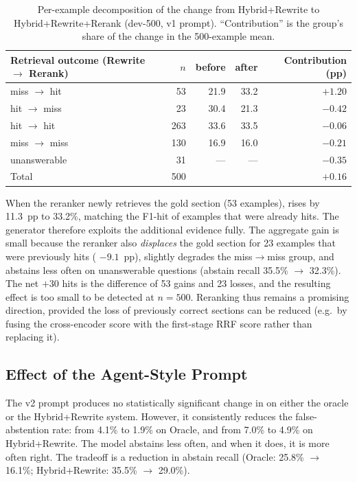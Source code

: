 \begin{table}[ht]
    \centering
    \caption{Per-example decomposition of the \fone{} change from Hybrid+Rewrite
             to Hybrid+Rewrite+Rerank (dev-500, v1 prompt). ``Contribution'' is
             the group's share of the change in the 500-example mean.}
    \label{tab:rag:rerank}
    \small
    \begin{tabular}{lrrrr}
        \toprule
        Retrieval outcome (Rewrite $\to$ Rerank) & $n$ & \fone{} before & \fone{} after & Contribution (pp) \\
        \midrule
        miss $\to$ hit   &  53 & 21.9 & 33.2 & $+1.20$ \\
        hit $\to$ miss   &  23 & 30.4 & 21.3 & $-0.42$ \\
        hit $\to$ hit    & 263 & 33.6 & 33.5 & $-0.06$ \\
        miss $\to$ miss  & 130 & 16.9 & 16.0 & $-0.21$ \\
        unanswerable     &  31 &  --- &  --- & $-0.35$ \\
        \midrule
        Total            & 500 &      &      & $+0.16$ \\
        \bottomrule
    \end{tabular}
\end{table}

When the reranker newly retrieves the gold section (53 examples), \fone{} rises by
11.3~pp to 33.2\%, matching the F1-hit of examples that were already hits. The
generator therefore exploits the additional evidence fully. The aggregate gain is
small because the reranker also \emph{displaces} the gold section for 23 examples
that were previously hits (\fone{} $-9.1$~pp), slightly degrades the
miss$\to$miss group, and abstains less often on unanswerable questions (abstain
recall 35.5\% $\to$ 32.3\%). The net $+30$ hits is the difference of 53 gains and
23 losses, and the resulting effect is too small to be detected at $n = 500$.
Reranking thus remains a promising direction, provided the loss of previously
correct sections can be reduced (e.g.\ by fusing the cross-encoder score with the
first-stage RRF score rather than replacing it).

\subsection{Effect of the Agent-Style Prompt}

The v2 prompt produces no statistically significant change in \fone{} on either the
oracle or the Hybrid+Rewrite system. However, it consistently reduces the
false-abstention rate: from 4.1\% to 1.9\% on Oracle, and from 7.0\% to 4.9\% on
Hybrid+Rewrite. The model abstains less often, and when it does, it is more often
right. The tradeoff is a reduction in abstain recall (Oracle:
25.8\% $\to$ 16.1\%; Hybrid+Rewrite: 35.5\% $\to$ 29.0\%).

